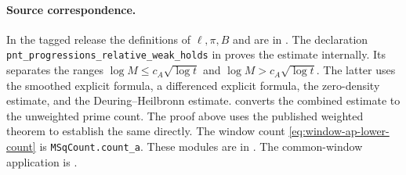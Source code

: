\paragraph{Source correspondence.}
In the tagged release the definitions of \(\ell,\pi,B\) and
 are in . The declaration
\texttt{pnt\_progressions\_relative\_weak\_holds} in
 proves the estimate internally. Its
 separates the ranges
\(\log M\le c_A\sqrt{\log t}\) and \(\log M>c_A\sqrt{\log t}\).
The latter uses the smoothed explicit formula, a differenced
explicit formula, the zero-density estimate, and the
Deuring--Heilbronn estimate.  converts the
combined estimate to the unweighted prime count. The proof above
uses the published weighted theorem to establish the same
 directly. The window count
\eqref{eq:window-ap-lower-count} is \texttt{MSqCount.count\_a}.
These modules are in
.
The common-window application is
.
